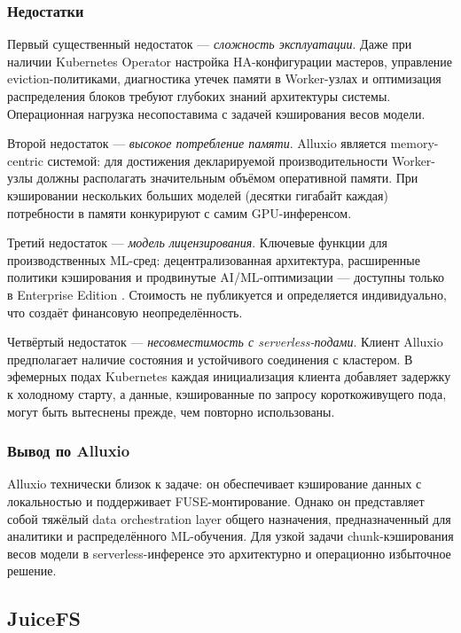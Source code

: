 \subsubsection{Недостатки}

Первый существенный недостаток --- \textit{сложность эксплуатации}. Даже при наличии Kubernetes Operator настройка HA-конфигурации мастеров, управление eviction-политиками, диагностика утечек памяти в Worker-узлах и оптимизация распределения блоков требуют глубоких знаний архитектуры системы. Операционная нагрузка несопоставима с задачей кэширования весов модели.

Второй недостаток --- \textit{высокое потребление памяти}. Alluxio является memory-centric системой: для достижения декларируемой производительности Worker-узлы должны располагать значительным объёмом оперативной памяти. При кэшировании нескольких больших моделей (десятки гигабайт каждая) потребности в памяти конкурируют с самим GPU-инференсом.

Третий недостаток --- \textit{модель лицензирования}. Ключевые функции для производственных ML-сред: децентрализованная архитектура, расширенные политики кэширования и продвинутые AI/ML-оптимизации --- доступны только в Enterprise Edition \cite{alluxio_pricing}. Стоимость не публикуется и определяется индивидуально, что создаёт финансовую неопределённость.

Четвёртый недостаток --- \textit{несовместимость с serverless-подами}. Клиент Alluxio предполагает наличие состояния и устойчивого соединения с кластером. В эфемерных подах Kubernetes каждая инициализация клиента добавляет задержку к холодному старту, а данные, кэшированные по запросу короткоживущего пода, могут быть вытеснены прежде, чем повторно использованы.

\subsubsection{Вывод по Alluxio}

Alluxio технически близок к задаче: он обеспечивает кэширование данных с локальностью и поддерживает FUSE-монтирование. Однако он представляет собой тяжёлый data orchestration layer общего назначения, предназначенный для аналитики и распределённого ML-обучения. Для узкой задачи chunk-кэширования весов модели в serverless-инференсе это архитектурно и операционно избыточное решение.

\subsection{JuiceFS}
\label{sec:juicefs}


